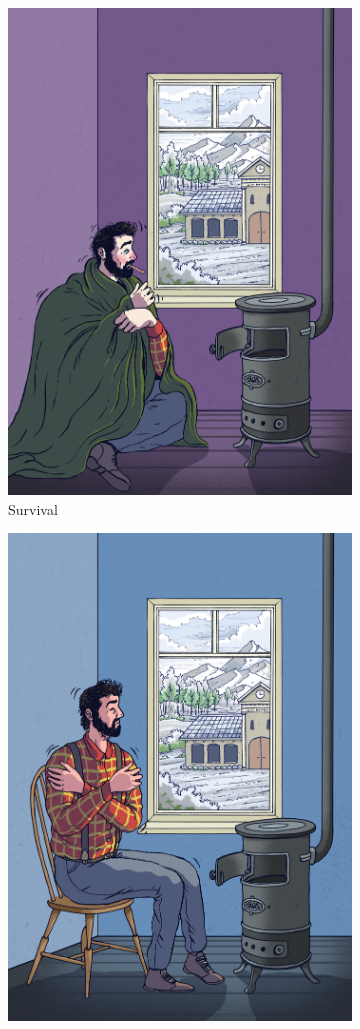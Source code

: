 \documentclass[egregdoesnotlikesansseriftitles]{scrartcl}
\begin{document}
\begin{figure}[ht!]
   \centering
   \begin{subfigure}[t]{0.45\textwidth}
      \centering
      \includegraphics[width=0.8\linewidth]{figures/figure_1_a.jpg}
      \caption{Survival}\label{fig:illu_survival}
   \end{subfigure}
   \hfill
   \begin{subfigure}[t]{0.45\textwidth}
      \centering
      \includegraphics[width=0.8\linewidth]{figures/figure_1_b.jpg}

\end{subfigure}
\end{figure}
\end{document}
